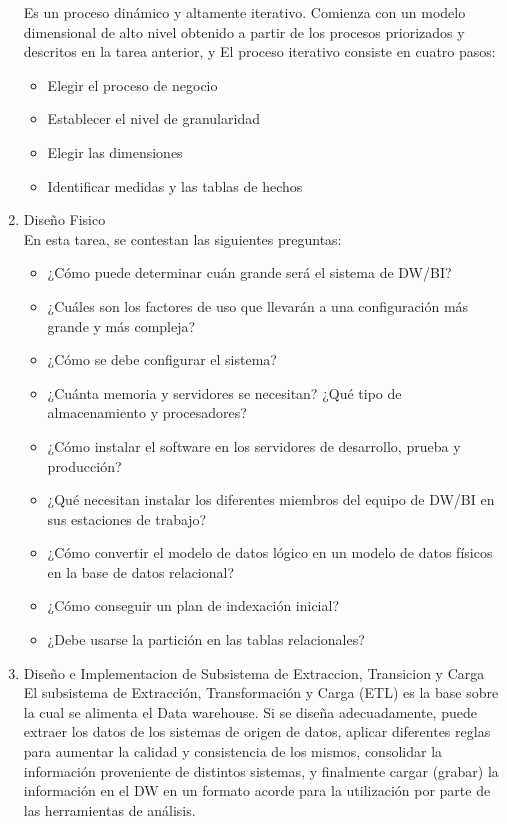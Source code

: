 \documentclass[preprint,12pt]{elsarticle}
\begin{document}
\begin{enumerate}[4.1]
Es un proceso dinámico y altamente iterativo. Comienza con un modelo dimensional de alto nivel obtenido a partir de los procesos priorizados y descritos en la tarea anterior, y El proceso iterativo consiste en cuatro pasos:

\begin{itemize}
  \item Elegir el proceso de negocio
  \item Establecer el nivel de granularidad
\item  Elegir las dimensiones
\item  Identificar medidas y las tablas de hechos

\end{itemize} 

\item Diseño Fisico \\

En esta tarea, se contestan las siguientes preguntas:

\begin{itemize}
  \item ¿Cómo puede determinar cuán grande será el sistema de DW/BI?
  \item ¿Cuáles son los factores de uso que llevarán a una configuración más grande y más compleja?
  \item ¿Cómo se debe configurar el sistema?
  \item ¿Cuánta memoria y servidores se necesitan? ¿Qué tipo de almacenamiento y procesadores?
 \item ¿Cómo instalar el software en los servidores de desarrollo, prueba y producción?
 \item ¿Qué necesitan instalar los diferentes miembros del equipo de DW/BI en sus estaciones de trabajo?
 \item ¿Cómo convertir el modelo de datos lógico en un modelo de datos físicos en la base de datos relacional?
 \item ¿Cómo conseguir un plan de indexación inicial?
 \item ¿Debe usarse la partición en las tablas relacionales? 

\end{itemize} 
\item Diseño e Implementacion de Subsistema de Extraccion, Transicion y Carga \\

El subsistema de Extracción, Transformación y Carga (ETL) es la base sobre la cual se alimenta el Data warehouse. Si se diseña adecuadamente, puede extraer los datos de los sistemas de origen de datos, aplicar diferentes reglas para aumentar la calidad y consistencia de los mismos, consolidar la información proveniente de distintos sistemas, y finalmente cargar (grabar) la información en el DW en un formato acorde para la utilización por parte de las herramientas de análisis.\\


\end{enumerate}
\end{document}

